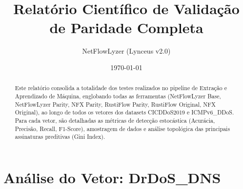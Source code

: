 \documentclass[11pt,a4paper]{article}
\title{Relatório Científico de Validação de Paridade Completa}
\author{NetFlowLyzer (Lynceus v2.0)}
\date{\today}
\begin{document}
\maketitle

\begin{abstract}
Este relatório consolida a totalidade dos testes realizados no pipeline de Extração e Aprendizado de Máquina, englobando todas as ferramentas (NetFlowLyzer Base, NetFlowLyzer Parity, NFX Parity, RustiFlow Parity, RustiFlow Original, NFX Original), ao longo de todos os vetores dos datasets CICDDoS2019 e ICMPv6\_DDoS. Para cada vetor, são detalhadas as métricas de detecção estocástica (Acurácia, Precisão, Recall, F1-Score), amostragem de dados e análise topológica das principais assinaturas preditivas (Gini Index).
\end{abstract}

\tableofcontents
\newpage
\section{Análise do Vetor: DrDoS\_DNS}
\end{document}
